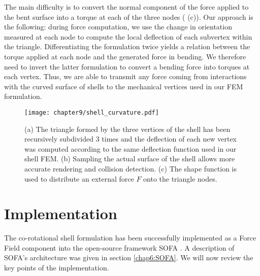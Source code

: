 The main difficulty is to convert the normal component of the force applied to the bent surface into a torque at each of the three nodes ( (c)). Our approach is the following: during force computation, we use the change in orientation measured at each node to compute the local deflection of each subvertex within the triangle. Differentiating the formulation twice yields a relation between the torque applied at each node and the generated force in bending. We therefore need to invert the latter formulation to convert a bending force into torques at each vertex. Thus, we are able to transmit any force coming from interactions with the curved surface of shells to the mechanical vertices used in our FEM formulation. 
%
\begin{figure}[ht]
\centering
\texttt{[image: chapter9/shell\_curvature.pdf]}
\caption {(a)  The triangle formed by the three vertices of the shell has been recursively subdivided 3 times and the deflection of each new vertex was computed according to the same deflection function used in our shell FEM. (b) Sampling the actual surface of the shell allows more accurate rendering and collision detection. (c) The shape function is used to distribute an external force $F$ onto the triangle nodes.}
\label{chap9:fig-shell}
\end{figure}


\section{Implementation}

The co-rotational shell formulation has been successfully implemented as a Force Field component into the open-source framework SOFA \citep{Allard07}. A description of SOFA's architecture was given in section \ref{chap6:SOFA}. We will now review the key points of the implementation.

